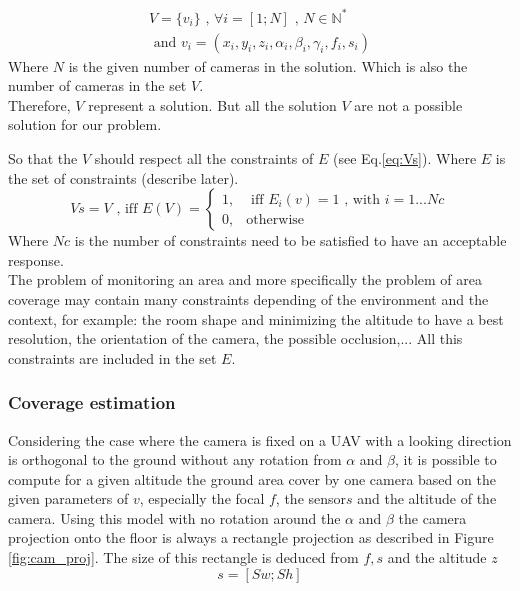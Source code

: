 \begin{equation}\label{eq:V}
\begin{split}
V= \{v_i\} \mbox{  , } \forall i=[1;N] \mbox{ , } N\in \mathbb{N}^*
\\
\mbox{ and } v_i= (x_i,y_i,z_i,\alpha_i ,\beta_i,\gamma_i,f_i,s_i)
\end{split}
\end{equation}
\noindent Where $N$ is the given number of cameras in the solution. Which is also the number of cameras in the set $V$. \\
Therefore, $V$ represent a solution. But all the solution $V$ are not a possible solution for our problem. 

So that the $V$ should respect all the constraints of $E$ (see Eq.\ref{eq:Vs}). Where $E$ is the set of constraints (describe later).
\begin{equation}\label{eq:Vs}
Vs=V \mbox{ , iff } E(V)=\begin{cases}1, & \mbox{  iff } E_i(v)=1 \mbox{ , with } i=1...Nc \\ 0, & \mbox{otherwise} 
\end{cases} 
\end{equation}
Where $Nc$ is the number of constraints need to be satisfied to have an acceptable response.\\
The problem of monitoring an area and more specifically the problem of area coverage may contain many constraints depending of the environment and the context, for example: the room shape and minimizing the altitude to have a best resolution, the orientation of the camera, the possible occlusion,... All this constraints are included in the set $E$. \\

\subsubsection{Coverage estimation} \label{sec:coverageEstimation}
Considering the case where the camera is fixed on a UAV with a looking direction is orthogonal to the ground without any rotation from $\alpha$ and $\beta$, it is  possible to compute for a given altitude the ground area cover by one camera based on the given parameters of $v$, especially the focal $f$, the sensor$s$ and the altitude of the camera. Using this model with no rotation around the $\alpha$ and $\beta$ the camera projection onto the floor is always a rectangle projection as described in Figure \ref{fig:cam_proj}. The size of this rectangle is deduced from $ f ,s$ and the altitude $z$ 
\begin{equation}
s= [Sw ; Sh]  %
\end{equation}

